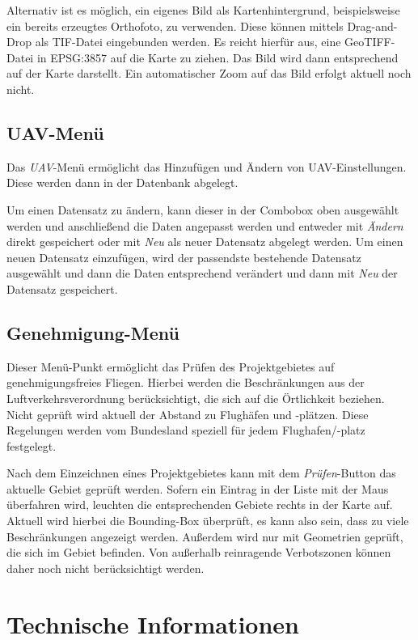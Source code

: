 \documentclass[a4paper,12pt,bibliography=totoc, listof=totoc,titlepage]{scrartcl}
\begin{document}
Alternativ ist es möglich, ein eigenes Bild als Kartenhintergrund, beispielsweise ein bereits erzeugtes Orthofoto, zu verwenden. Diese können mittels Drag-and-Drop als TIF-Datei eingebunden werden. Es reicht hierfür aus, eine GeoTIFF-Datei in EPSG:3857 auf die Karte zu ziehen. Das Bild wird dann entsprechend auf der Karte darstellt. Ein automatischer Zoom auf das Bild erfolgt aktuell noch nicht.

\subsection{UAV-Menü}
\label{uav}
Das \textit{UAV}-Menü ermöglicht das Hinzufügen und Ändern von UAV-Einstellungen. Diese werden dann in der Datenbank abgelegt.

Um einen Datensatz zu ändern, kann dieser in der Combobox oben ausgewählt werden und anschließend die Daten angepasst werden und entweder mit \textit{Ändern} direkt gespeichert oder mit \textit{Neu} als neuer Datensatz abgelegt werden. Um einen neuen Datensatz einzufügen, wird der passendste bestehende Datensatz ausgewählt und dann die Daten entsprechend verändert und dann mit \textit{Neu} der Datensatz gespeichert.

\subsection{Genehmigung-Menü}
Dieser Menü-Punkt ermöglicht das Prüfen des Projektgebietes auf genehmigungsfreies Fliegen. Hierbei werden die Beschränkungen aus der Luftverkehrsverordnung berück\-sichtigt, die sich auf die Örtlichkeit beziehen. Nicht geprüft wird aktuell der Abstand zu Flughäfen und -plätzen. Diese Regelungen werden vom Bundesland speziell für jedem Flughafen/-platz festgelegt.

Nach dem Einzeichnen eines Projektgebietes kann mit dem \textit{Prüfen}-Button das aktuelle Gebiet geprüft werden. Sofern ein Eintrag in der Liste mit der Maus überfahren wird, leuchten die entsprechenden Gebiete rechts in der Karte auf. Aktuell wird hierbei die Bounding-Box überprüft, es kann also sein, dass zu viele Beschränkungen angezeigt werden. Außerdem wird nur mit Geometrien geprüft, die sich im Gebiet befinden. Von außerhalb reinragende Verbotszonen können daher noch nicht berücksichtigt werden.

\section{Technische Informationen}
\label{technische_information}
\end{document}
